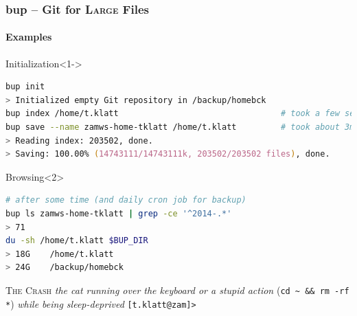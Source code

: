 \documentclass[english,hyperref={pdfpagelabels=false},aspectratio=1610]{beamer}
\begin{document}
\begin{frame}[fragile]
  \frametitle{bup -- Git for \textsc{Large} Files}
  \framesubtitle{Examples}
  \begin{block}{Initialization}<1->
    \vspace{-0.75em}
    \begin{lstlisting}[language=zsh]
bup init
> Initialized empty Git repository in /backup/homebck
bup index /home/t.klatt                                 # took a few seconds
bup save --name zamws-home-tklatt /home/t.klatt         # took about 3min
> Reading index: 203502, done.
> Saving: 100.00% (14743111/14743111k, 203502/203502 files), done.
    \end{lstlisting}
    \vspace{-0.75em}
  \end{block}
  \begin{block}{Browsing}<2>
    \vspace{-0.75em}
    \begin{lstlisting}[language=zsh]
# after some time (and daily cron job for backup)
bup ls zamws-home-tklatt | grep -ce '^2014-.*'
> 71
du -sh /home/t.klatt $BUP_DIR
> 18G    /home/t.klatt
> 24G    /backup/homebck
    \end{lstlisting}
    \vspace{-0.75em}
  \end{block}
\end{frame}

{
\begin{frame}[plain]
  \centering
  \color{white}
  {\Huge \textsc{The Crash}}
  \vfill
  {\scriptsize \emph{the cat running over the keyboard or a stupid action} {\color{fzjgray50}(\texttt{cd \textasciitilde~\&\& rm -rf *})} \emph{while being sleep-deprived}}
  \vfill
  \color{green}
  \texttt{[t.klatt@zam]>\textunderscore}
\end{frame}
}
\end{document}

